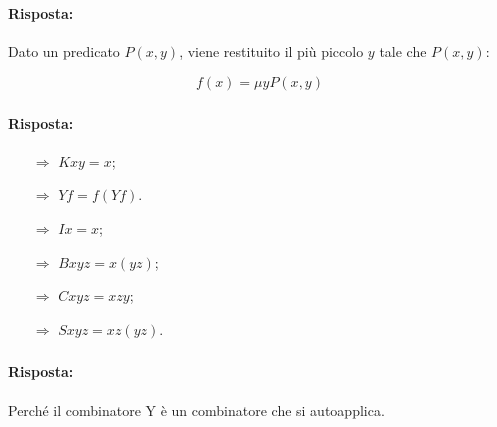 \subsubsection{}


\paragraph{Risposta:} Dato un predicato $P(x, y)$, viene restituito il più piccolo $y$ tale che $P(x, y)$:

$$
f(x) = \mu y P(x, y)
$$

\subsubsection{}


\paragraph{Risposta:}

\begin{itemize}
    \item [$\Rightarrow$] $K x y = x$;
    \item [$\Rightarrow$] $Y f = f (Y f)$.
    \item [$\Rightarrow$] $I x = x$;
    \item [$\Rightarrow$] $B x y z = x (y z)$;
    \item [$\Rightarrow$] $C x y z = x z y$;
    \item [$\Rightarrow$] $S x y z = x z (y z)$.
\end{itemize}

\subsubsection{}


\paragraph{Risposta:} Perché il combinatore Y è un combinatore che si autoapplica.

